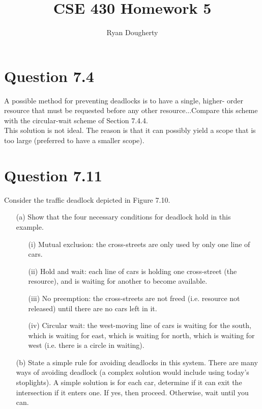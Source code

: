 \documentclass[12pt]{article}
\title{CSE 430 Homework 5}
\author{Ryan Dougherty}
\date{}                                           %
\begin{document}
\maketitle

\section*{Question 7.4} {\color{blue}A possible method for preventing deadlocks is to have a single, higher- order resource that must be requested before any other resource...Compare this scheme with the circular-wait scheme of Section 7.4.4.}
\\ 
This solution is not ideal. The reason is that it can possibly yield a scope that is too large (preferred to have a smaller scope).

\section*{Question 7.11} {\color{blue}Consider the traffic deadlock depicted in Figure 7.10.
\begin{enumerate}
\item[(a)]Show that the four necessary conditions for deadlock hold in this example. {\color{black}
\begin{itemize}
\item[(i)]Mutual exclusion: the cross-streets are only used by only one line of cars.
\item[(ii)]Hold and wait: each line of cars is holding one cross-street (the resource), and is waiting for another to become available.
\item[(iii)]No preemption: the cross-streets are not freed (i.e. resource not released) until there are no cars left in it.
\item[(iv)]Circular wait: the west-moving line of cars is waiting for the south, which is waiting for east, which is waiting for north, which is waiting for west (i.e. there is a circle in waiting).
\end{itemize}
}
\item[(b)]State a simple rule for avoiding deadlocks in this system. {\color{black} There are many ways of avoiding deadlock (a complex solution would include using today's stoplights). A simple solution is for each car, determine if it can exit the intersection if it enters one. If yes, then proceed. Otherwise, wait until you can.
}
\end{enumerate}
}
\end{document}
